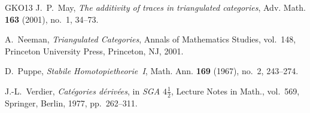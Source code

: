\documentclass[a4paper,reqno,10pt]{amsart}
\numberwithin{equation}{section}
\begin{document}
\begin{thebibliography}{GKO13}
J.~P.~May,
\emph{The additivity of traces in triangulated categories},
Adv. Math. \textbf{163} (2001), no.~1, 34--73.

A.~Neeman,
\emph{Triangulated Categories},
Annals of Mathematics Studies, vol.~148,
Princeton University Press, Princeton, NJ, 2001.

D.~Puppe,
\emph{Stabile Homotopietheorie~I},
Math. Ann. \textbf{169} (1967), no.~2, 243--274.

J.-L.~Verdier,
\emph{Cat\'egories d\'eriv\'ees},
in \emph{SGA $4\frac12$}, Lecture Notes in Math., vol.~569,
Springer, Berlin, 1977, pp.~262--311.

\end{thebibliography}
\end{document}
